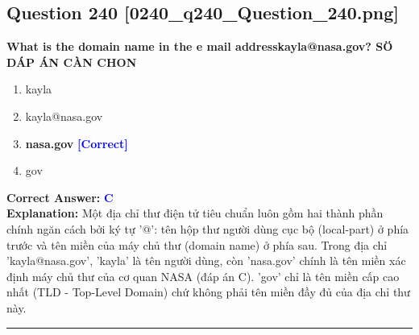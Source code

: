 \documentclass[11pt,a4paper]{article}
\begin{document}
\begin{minipage}{\textwidth}
\subsection*{Question 240 \quad \footnotesize{[0240\_q240\_Question\_240.png]}}
\noindent \textbf{What is the domain name in the e mail addresskayla@nasa.gov? SÖ DÁP ÁN CÀN CHON}

\begin{enumerate}[label=\Alph*.]
    \item kayla
    \item kayla@nasa.gov
    \item \textbf{nasa.gov} \hfill \textcolor{blue}{\textbf{[Correct]}}
    \item gov
\end{enumerate}

\noindent \textbf{Correct Answer:} \textcolor{blue}{\textbf{C}} \\[2pt]
\noindent \textbf{Explanation:} Một địa chỉ thư điện tử tiêu chuẩn luôn gồm hai thành phần chính ngăn cách bởi ký tự '@': tên hộp thư người dùng cục bộ (local-part) ở phía trước và tên miền của máy chủ thư (domain name) ở phía sau. Trong địa chỉ 'kayla@nasa.gov', 'kayla' là tên người dùng, còn 'nasa.gov' chính là tên miền xác định máy chủ thư của cơ quan NASA (đáp án C). 'gov' chỉ là tên miền cấp cao nhất (TLD - Top-Level Domain) chứ không phải tên miền đầy đủ của địa chỉ thư này.

\par\vspace{0.3cm}
\hrule
\vspace{0.3cm}
\end{minipage}
\end{document}
